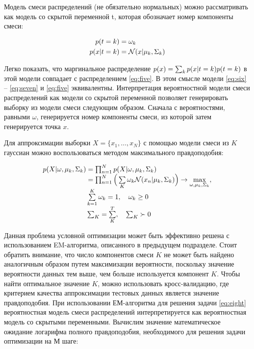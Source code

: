 Модель смеси распределений (не обязательно нормальных) можно рассматривать как модель со скрытой переменной t, которая обозначает номер компоненты смеси:

\begin{align}
p(t=k) &= \omega_k \label{eq:six}\\
p(x \arrowvert t = k) &= \mathcal{N}(x \arrowvert \mu_k, \Sigma_k) \label{eq:seven}
\end{align}

Легко показать, что маргинальное распределение $p(x) = \sum_k p(x \arrowvert t = k)p(t = k)$ в этой модели совпадает с распределением \ref{eq:five}. В этом смысле модели \ref{eq:six} -- \ref{eq:seven} и \ref{eq:five} эквивалентны.
Интерпретация вероятностной модели смеси распределений как модели со скрытой переменной позволяет генерировать выборку из модели смеси следующим образом. Сначала с вероятностями, равными $\omega$, генерируется номер компоненты смеси, из которой затем генерируется точка $x$.

Для аппроксимации выборки $X = \{x_1, \dots , x_N \}$ с помощью модели смеси из $K$ гауссиан можно воспользоваться методом максимального правдоподобия:

\begin{equation} 
	\begin{array}{r@{}l} \label{eq:eight}
		 p(X \arrowvert \omega, {\mu_k}, {\Sigma_k}) &{}= \prod_{n=1}^{N} p(X \arrowvert \omega, {\mu_k}, {\Sigma_k}) \\ &{}= \prod_{n=1}^{N} \Big ( \sum\limits_{K}^{} \omega_k \mathcal{N}(x_n \arrowvert \mu_k, \Sigma_k) \Big ) \rightarrow \max\limits_{\omega, {\mu_k}, {\Sigma_k}}^{}, \\
		 &{}\sum\limits_{k=1}^{K} \omega_k = 1, \quad \omega_k \geq 0 \\
		 &{}\sum_{K} = \sum\limits_{K}^{T}, \quad \sum_{K} \succ 0
	\end{array}{}
\end{equation}

Данная проблема условной оптимизации может быть эффективно решена с использованием EM-алгоритма, описанного в предыдущем подразделе. Стоит обратить внимание, что число компонентов смеси $K$ не может быть найдено аналогичным образом путем максимизации вероятности, поскольку значение вероятности данных тем выше, чем больше используется компонент $K$. Чтобы найти оптимальное значение $K$, можно использовать кросс-валидацию, где критерием качества аппроксимации тестовых данных является значение правдоподобия. \cite{em}
При использовании ЕМ-алгоритма для решения задачи \ref{eq:eight} вероятностная модель смеси распределений интерпретируется как вероятностная модель со скрытыми переменными. Вычислим значение математическое ожидание логарифма полного правдоподобия, необходимого для решения задачи оптимизации на М шаге:


